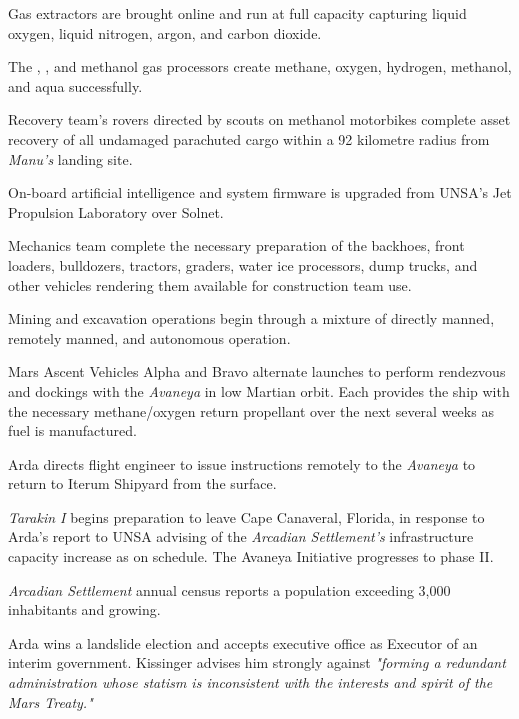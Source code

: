 Gas extractors are brought online and run at full capacity capturing liquid oxygen, liquid nitrogen, argon, and carbon dioxide. 

The , , and methanol gas processors create methane, oxygen, hydrogen, methanol, and aqua successfully.
\StopTimelineDate

Recovery team's rovers directed by scouts on methanol motorbikes complete asset recovery of all undamaged parachuted cargo within a 92 kilometre radius from {\it Manu's} landing site.
\StopTimelineDate

On-board artificial intelligence and system firmware is upgraded from UNSA's Jet Propulsion Laboratory over Solnet.

Mechanics team complete the necessary preparation of the backhoes, front loaders, bulldozers, tractors, graders, water ice processors, dump trucks, and other vehicles rendering them available for construction team use.

Mining and excavation operations begin through a mixture of directly manned, remotely manned, and autonomous operation.
\StopTimelineDate

Mars Ascent Vehicles Alpha and Bravo alternate launches to perform rendezvous and dockings with the {\it Avaneya} in low Martian orbit. Each provides the ship with the necessary methane/oxygen return propellant over the next several weeks as fuel is manufactured.
\StopTimelineDate

Arda directs flight engineer to issue instructions remotely to the {\it Avaneya} to return to Iterum Shipyard from the surface.
\StopTimelineDate

{\it Tarakin I} begins preparation to leave Cape Canaveral, Florida, in response to Arda's report to UNSA advising of the {\it Arcadian Settlement's} infrastructure capacity increase as on schedule. The Avaneya Initiative progresses to phase II.
\StopTimelineDate

{\it Arcadian Settlement} annual census reports a population exceeding 3,000 inhabitants and growing.
\StopTimelineDate

Arda wins a landslide election and accepts executive office as Executor of an interim government. Kissinger advises him strongly against {\it "forming a redundant administration whose statism is inconsistent with the interests and spirit of the Mars Treaty."}
\StopTimelineDate

